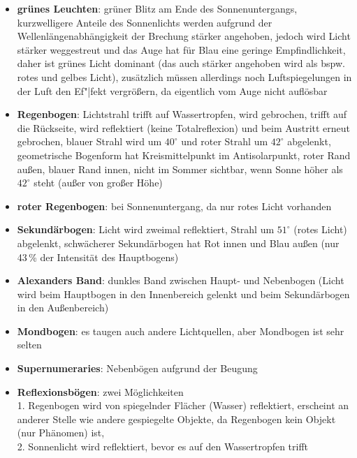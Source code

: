 \linie
\begin{itemize}
    \item
    \textbf{grünes Leuchten}:
    grüner Blitz am Ende des Sonnenuntergangs,
    kurzwelligere Anteile des Sonnenlichts werden aufgrund der
    Wellenlängenabhängigkeit der Brechung stärker angehoben, jedoch
    wird Licht stärker weggestreut und das Auge hat für Blau eine geringe
    Empfindlichkeit, daher ist grünes Licht dominant
    (das auch stärker angehoben wird als bspw. rotes und gelbes Licht),
    zusätzlich müssen allerdings noch Luftspiegelungen in der Luft den
    Ef"|fekt vergrößern, da eigentlich vom Auge nicht auflösbar
\end{itemize}
\linie
\pagebreak
\begin{itemize}
    \item
    \textbf{Regenbogen}:
    Lichtstrahl trifft auf Wassertropfen,
    wird gebrochen, trifft auf die Rückseite,
    wird reflektiert (keine Totalreflexion) und beim Austritt
    erneut gebrochen, blauer Strahl wird um $40^\circ$ und roter Strahl
    um $42^\circ$ abgelenkt,
    geometrische Bogenform hat Kreismittelpunkt im Antisolarpunkt,
    roter Rand außen, blauer Rand innen,
    nicht im Sommer sichtbar, wenn Sonne höher als $42^\circ$ steht
    (außer von großer Höhe)

    \item
    \textbf{roter Regenbogen}:
    bei Sonnenuntergang, da nur rotes Licht vorhanden

    \item
    \textbf{Sekundärbogen}:
    Licht wird zweimal reflektiert,
    Strahl um $51^\circ$ (rotes Licht) abgelenkt, schwächerer Sekundärbogen hat
    Rot innen und Blau außen (nur 43\,\% der Intensität des Hauptbogens)

    \item
    \textbf{Alexanders Band}:
    dunkles Band zwischen Haupt- und Nebenbogen
    (Licht wird beim Hauptbogen in den Innenbereich gelenkt und beim
    Sekundärbogen in den Außenbereich)

    \item
    \textbf{Mondbogen}:
    es taugen auch andere Lichtquellen,
    aber Mondbogen ist sehr selten

    \item
    \textbf{Supernumeraries}:
    Nebenbögen aufgrund der Beugung

    \item
    \textbf{Reflexionsbögen}: zwei Möglichkeiten \\
    1. Regenbogen wird von spiegelnder Flächer (Wasser) reflektiert,
    erscheint an anderer Stelle wie andere gespiegelte Objekte, da
    Regenbogen kein Objekt (nur Phänomen) ist, \\
    2. Sonnenlicht wird reflektiert, bevor es auf den Wassertropfen trifft


\end{itemize}

